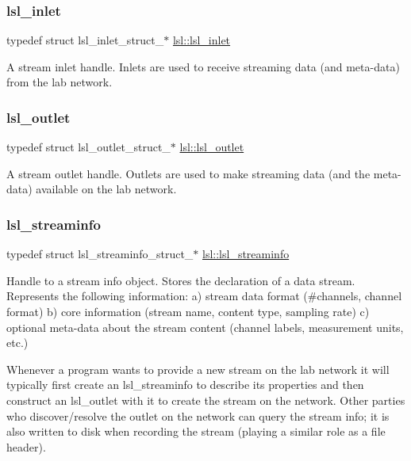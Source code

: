 \subsubsection{\texorpdfstring{lsl\+\_\+inlet}{lsl\_inlet}}
{\footnotesize\ttfamily typedef struct lsl\+\_\+inlet\+\_\+struct\+\_\+$\ast$ \hyperlink{namespacelsl_a884a3363cfcba75d7ce8f00c1c4c54f1}{lsl\+::lsl\+\_\+inlet}}

A stream inlet handle. Inlets are used to receive streaming data (and meta-\/data) from the lab network. \mbox{\label{namespacelsl_abcf512b0f66dacf86c10b165995fd50b}} 
\subsubsection{\texorpdfstring{lsl\+\_\+outlet}{lsl\_outlet}}
{\footnotesize\ttfamily typedef struct lsl\+\_\+outlet\+\_\+struct\+\_\+$\ast$ \hyperlink{namespacelsl_abcf512b0f66dacf86c10b165995fd50b}{lsl\+::lsl\+\_\+outlet}}

A stream outlet handle. Outlets are used to make streaming data (and the meta-\/data) available on the lab network. \mbox{\label{namespacelsl_aa0a9ce9956061679949daa2e35aae2e8}} 
\subsubsection{\texorpdfstring{lsl\+\_\+streaminfo}{lsl\_streaminfo}}
{\footnotesize\ttfamily typedef struct lsl\+\_\+streaminfo\+\_\+struct\+\_\+$\ast$ \hyperlink{namespacelsl_aa0a9ce9956061679949daa2e35aae2e8}{lsl\+::lsl\+\_\+streaminfo}}

Handle to a stream info object. Stores the declaration of a data stream. Represents the following information\+: a) stream data format (\#channels, channel format) b) core information (stream name, content type, sampling rate) c) optional meta-\/data about the stream content (channel labels, measurement units, etc.)

Whenever a program wants to provide a new stream on the lab network it will typically first create an lsl\+\_\+streaminfo to describe its properties and then construct an lsl\+\_\+outlet with it to create the stream on the network. Other parties who discover/resolve the outlet on the network can query the stream info; it is also written to disk when recording the stream (playing a similar role as a file header). \mbox{\label{namespacelsl_a5edc7a49a1a1be1634fe6dce3d59c59b}} 
